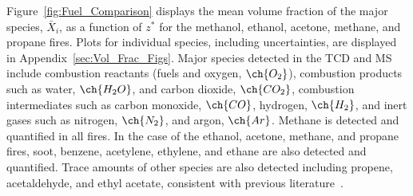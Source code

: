 \documentclass[12pt]{article}
\begin{document}
Figure~\ref{fig:Fuel_Comparison} displays the mean volume fraction of the major species, $\bar{X}_{i}$, as a function of $z^*$ for the methanol, ethanol, acetone, methane, and propane fires. Plots for individual species, including uncertainties, are displayed in Appendix~\ref{sec:Vol_Frac_Figs}. Major species detected in the TCD and MS include combustion reactants (fuels and oxygen, $\ch{O_2}$), combustion products such as water, $\ch{H_{2}O}$, and carbon dioxide, $\ch{CO_{2}}$, combustion intermediates such as carbon monoxide, $\ch{CO}$, hydrogen, $\ch{H_{2}}$, and inert gases such as nitrogen, $\ch{N_{2}}$, and argon, $\ch{Ar}$. Methane is detected and quantified in all fires. In the case of the ethanol, acetone, methane, and propane fires, soot, benzene, acetylene, ethylene, and ethane are also detected and quantified. Trace amounts of other species are also detected including propene, acetaldehyde, and ethyl acetate, consistent with previous literature~\cite{Pichon2009, Gong2015}.
\end{document}
